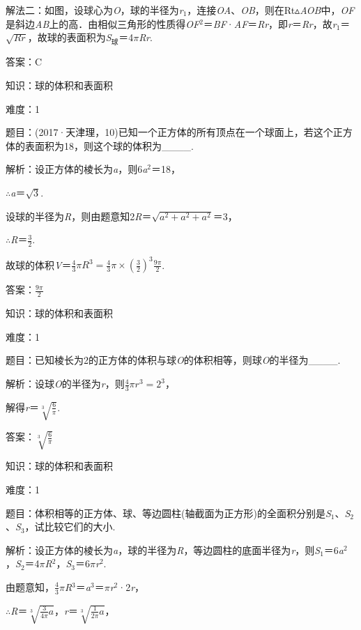 \documentclass{article} %
\begin{document}
解法二：如图，设球心为\textit{O}，球的半径为\textit{r}${}_{1}$，连接\textit{OA}、\textit{OB}，则在Rt$\mathrm{\vartriangle}$\textit{AOB}中，\textit{OF}是斜边\textit{AB}上的高．由相似三角形的性质得\textit{OF}${}^{2}$＝\textit{BF}·\textit{AF}＝\textit{Rr}，即\textit{r}＝\textit{Rr}，故\textit{r}${}_{1}$＝$\sqrt{Rr}$，故球的表面积为\textit{S}${}_{\textrm{球}}$＝4$\pi$\textit{Rr}.

答案：C

知识：球的体积和表面积

难度：1

题目：(2017·天津理，10)已知一个正方体的所有顶点在一个球面上，若这个正方体的表面积为18，则这个球的体积为\_\_\_\_.

解析：设正方体的棱长为\textit{a}，则6\textit{a}${}^{2}$＝18，

$\mathrm{\therefore}$\textit{a}＝$\sqrt{3}$.

设球的半径为\textit{R}，则由题意知2\textit{R}＝$\sqrt{a^2+a^2+a^2}$＝3，

$\mathrm{\therefore}$\textit{R}＝$\frac{3}{2}$.

故球的体积\textit{V}＝$\frac{4}{3}\pi R^3=\frac{4}{3}\pi\times(\frac{3}{2})^3\frac{9\pi}{2}$.

答案：$\frac{9\pi}{2}$

知识：球的体积和表面积

难度：1

题目：已知棱长为2的正方体的体积与球\textit{O}的体积相等，则球\textit{O}的半径为\_\_\_\_.



解析：设球\textit{O}的半径为\textit{r}，则$\frac{4}{3}\pi r^3=2^3$，

解得\textit{r}＝$\sqrt[3]{\frac{6}{\pi}}$.

答案：$\sqrt[3]{\frac{6}{\pi}}$

知识：球的体积和表面积

难度：1

题目：体积相等的正方体、球、等边圆柱(轴截面为正方形)的全面积分别是\textit{S}${}_{1}$、\textit{S}${}_{2}$、\textit{S}${}_{3}$，试比较它们的大小.

解析：设正方体的棱长为\textit{a}，球的半径为\textit{R}，等边圆柱的底面半径为\textit{r}，则\textit{S}${}_{1}$＝6\textit{a}${}^{2}$，\textit{S}${}_{2}$＝4$\pi$\textit{R}${}^{2}$，\textit{S}${}_{3}$＝6$\pi$\textit{r}${}^{2}$.

由题意知，$\frac{4}{3}\pi$\textit{R}${}^{3}$＝\textit{a}${}^{3}$＝$\pi$\textit{r}${}^{2}$·2\textit{r}，

$\mathrm{\therefore}$\textit{R}＝$\sqrt[3]{\frac{3}{4\pi}a}$，\textit{r}＝$\sqrt[3]{\frac{1}{2\pi}a}$，
\end{document}
